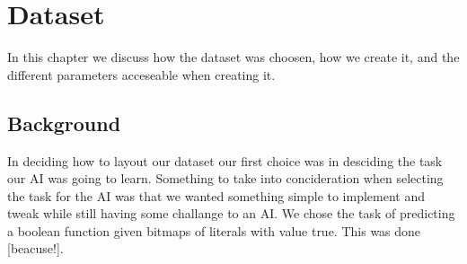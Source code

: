 \chapter{Dataset}

In this chapter we discuss how the dataset was choosen, how we create it, and the different parameters 
acceseable when creating it. 

\section{Background}

In deciding how to layout our dataset our first choice was in desciding the task our AI was going to learn.
Something to take into concideration when selecting the task for the AI was that we wanted something simple to
implement and tweak while still having some challange to an AI.
We chose the task of predicting a boolean function given bitmaps of literals with value true. 
This was done [beacuse!]. 
